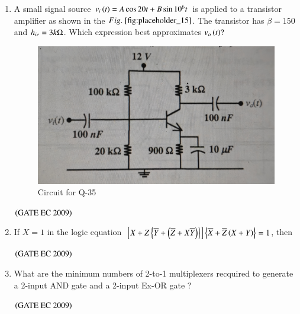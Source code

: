 \documentclass[journal,12pt,onecolumn]{IEEEtran}
\theoremstyle{remark}
\begin{document}
\begin{enumerate}[start=1, label={Q\arabic*.}]
\item A small signal source $v_i\left(t\right) = A\cos{20t} + B \sin{10^6t}$ is applied to a transistor amplifier as shown in the $\figref{fig:placeholder_15}$. The transistor has $\beta = 150$ and $h_{ie} = 3k\ohm$. Which expression best approximates $v_o\left(t\right) ?$
\begin{figure}[H]
    \centering
    \includegraphics[width=0.5\columnwidth]{figs/fig_15.jpg}
    \caption{\centering Circuit for Q-35}
    \label{fig:placeholder_15}
\end{figure}
\begin{enumerate}
\end{enumerate}
\hfill $\left(\text{GATE EC 2009}\right)$

\item If $X=1$ in the logic equation ${}\left[X + Z\left\{\overline{Y} + \left(\overline{Z} + X\overline{Y}\right)\right\}\right] \left\{\overline{X} + \overline{Z}\left(X+Y\right)\right\} = 1$, then
\begin{enumerate}
\end{enumerate}
\hfill $\left(\text{GATE EC 2009}\right)$

\item What are the minimum numbers of 2-to-1 multiplexers recquired to generate a 2-input AND gate and a 2-input Ex-OR gate ?
\begin{enumerate}
\end{enumerate}
\hfill $\left(\text{GATE EC 2009}\right)$


\end{enumerate}
\end{document}
